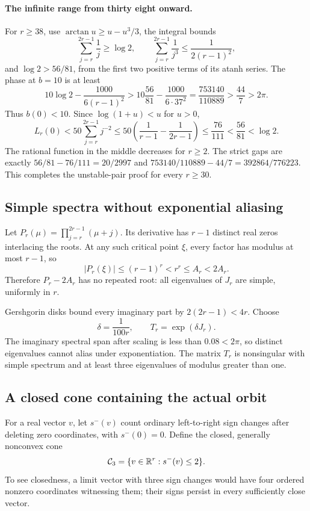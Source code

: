 \paragraph{The infinite range from thirty eight onward.}
For $r\ge38$, use $\arctan u\ge u-u^3/3$, the integral bounds
\[
 \sum_{j=r}^{2r-1}\frac1j\ge\log2,\qquad
 \sum_{j=r}^{2r-1}\frac1{j^3}\le\frac1{2(r-1)^2},
\]
and $\log2>56/81$, from the first two positive terms of its atanh series. The phase at $b=10$ is at least
\begin{equation}\label{his:eq:infinitephase}
 10\log2-\frac{1000}{6(r-1)^2}
 >10\frac{56}{81}-\frac{1000}{6\cdot37^2}
 =\frac{753140}{110889}>\frac{44}7>2\pi.
\end{equation}
Thus $b(0)<10$. Since $\log(1+u)<u$ for $u>0$,
\begin{equation}\label{his:eq:infinitemod}
 L_r(0)<50\sum_{j=r}^{2r-1}j^{-2}
 \le50\left(\frac1{r-1}-\frac1{2r-1}\right)
 \le\frac{76}{111}<\frac{56}{81}<\log2.
\end{equation}
The rational function in the middle decreases for $r\ge2$. The strict gaps are exactly
$56/81-76/111=20/2997$ and
$753140/110889-44/7=392864/776223$.
This completes the unstable-pair proof for every $r\ge30$.

\subsection{Simple spectra without exponential aliasing}
Let $P_r(\mu)=\prod_{j=r}^{2r-1}(\mu+j)$. Its derivative has $r-1$ distinct real zeros interlacing the roots. At any such critical point $\xi$, every factor has modulus at most $r-1$, so
\[
 |P_r(\xi)|\le(r-1)^r<r^r\le A_r<2A_r.
\]
Therefore $P_r-2A_r$ has no repeated root: all eigenvalues of $J_r$ are simple, uniformly in $r$.

Gershgorin disks bound every imaginary part by $2(2r-1)<4r$. Choose
\begin{equation}\label{his:eq:Tr}
 \delta=\frac1{100r},\qquad T_r=\exp(\delta J_r).
\end{equation}
The imaginary spectral span after scaling is less than $0.08<2\pi$, so distinct eigenvalues cannot alias under exponentiation. The matrix $T_r$ is nonsingular with simple spectrum and at least three eigenvalues of modulus greater than one.

\subsection{A closed cone containing the actual orbit}
For a real vector $v$, let $s^-(v)$ count ordinary left-to-right sign changes after deleting zero coordinates, with $s^-(0)=0$. Define the closed, generally nonconvex cone
\begin{equation}\label{his:eq:cone}
 \mathcal C_3=\{v\in\mathbb R^r:s^-(v)\le2\}.
\end{equation}
To see closedness, a limit vector with three sign changes would have four ordered nonzero coordinates witnessing them; their signs persist in every sufficiently close vector.

